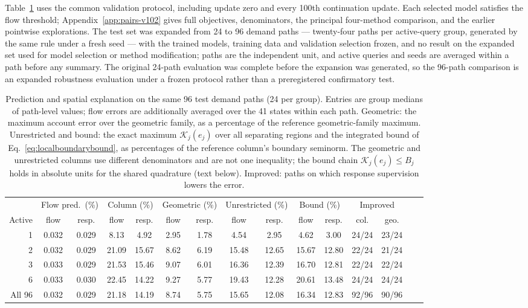 Table~\ref{tab:pathtable} uses the common validation protocol, including update zero and every 100th continuation update. Each selected model satisfies the flow threshold; Appendix~\ref{app:pairs-v102} gives full objectives, denominators, the principal four-method comparison, and the earlier pointwise explorations. The test set was expanded from 24 to 96 demand paths --- twenty-four paths per active-query group, generated by the same rule under a fresh seed --- with the trained models, training data and validation selection frozen, and no result on the expanded set used for model selection or method modification; paths are the independent unit, and active queries and seeds are averaged within a path before any summary. The original 24-path evaluation was complete before the expansion was generated, so the 96-path comparison is an expanded robustness evaluation under a frozen protocol rather than a preregistered confirmatory test.
\begin{table}[t]\centering\footnotesize
\caption{Prediction and spatial explanation on the same 96 test demand
paths (24 per group). Entries are group medians of path-level values;
flow errors are additionally averaged over the 41 states within each
path. Geometric: the maximum account error over the geometric family,
as a percentage of the reference geometric-family maximum.
Unrestricted and bound: the exact maximum $\mathcal K_j(e_j)$ over all
separating regions and the integrated bound of
Eq.~\eqref{eq:localboundarybound}, as percentages of the reference
column's boundary seminorm. The geometric and unrestricted columns use
different denominators and are not one inequality; the bound chain
$\mathcal K_j(e_j)\le B_j$ holds in absolute units for the shared
quadrature (text below). Improved:
paths on which response supervision lowers the error.}\label{tab:pathtable}
\setlength{\tabcolsep}{3.4pt}
\begin{tabular*}{\tblwidth}{@{\extracolsep{\fill}}rcccccc cc cc cc cc}
\toprule
& \multicolumn{2}{c}{Flow pred.\ (\%)} & \multicolumn{2}{c}{Column (\%)} & \multicolumn{2}{c}{Geometric (\%)} & \multicolumn{2}{c}{Unrestricted (\%)} & \multicolumn{2}{c}{Bound (\%)} & \multicolumn{2}{c}{Improved}\\
\cmidrule(lr){2-3}\cmidrule(lr){4-5}\cmidrule(lr){6-7}\cmidrule(lr){8-9}\cmidrule(lr){10-11}\cmidrule(lr){12-13}
Active & flow & resp. & flow & resp. & flow & resp. & flow & resp. & flow & resp. & col. & geo.\\
\midrule
1 & 0.032 & 0.029 & 8.13 & 4.92 & 2.95 & 1.78 & 4.54 & 2.95 & 4.62 & 3.00 & 24/24 & 23/24\\
2 & 0.032 & 0.029 & 21.09 & 15.67 & 8.62 & 6.19 & 15.48 & 12.65 & 15.67 & 12.80 & 22/24 & 21/24\\
3 & 0.033 & 0.029 & 21.53 & 15.46 & 9.07 & 6.01 & 16.36 & 12.39 & 16.70 & 12.81 & 22/24 & 22/24\\
6 & 0.033 & 0.030 & 22.45 & 14.22 & 9.27 & 5.77 & 19.43 & 12.28 & 20.61 & 13.48 & 24/24 & 24/24\\
\midrule
All 96 & 0.032 & 0.029 & 21.18 & 14.19 & 8.74 & 5.75 & 15.65 & 12.08 & 16.34 & 12.83 & 92/96 & 90/96\\
\bottomrule\end{tabular*}\end{table}
